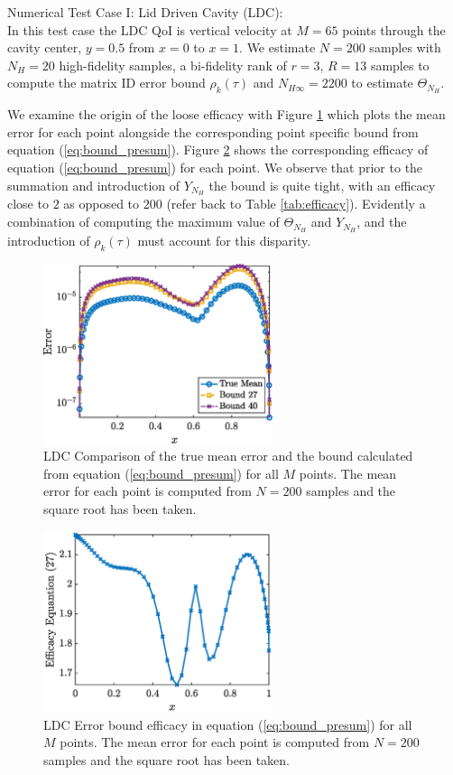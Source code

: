 \documentclass{report}
\begin{document}
Numerical Test Case I: Lid Driven Cavity (LDC): \\

In this test case the LDC QoI is vertical velocity at $M=65$ points through the cavity center, $y=0.5$ from $x=0$ to $x=1$. We estimate $N=200$ samples with $N_H = 20$ high-fidelity samples, a bi-fidelity rank of $r=3$, $R=13$ samples to compute the matrix ID error bound $\rho_k(\tau)$ and $N_{H\infty} = 2200$ to estimate $\Theta_{N_H}$. 

We examine the origin of the loose efficacy with Figure \ref{fig:LDC_eq_27_bound} which plots the mean error for each point alongside the corresponding point specific bound from equation (\ref{eq:bound_presum}). Figure \ref{fig:LDC_eq_27_efficacy} shows the corresponding efficacy of equation (\ref{eq:bound_presum}) for each point. We observe that prior to the summation and introduction of $Y_{N_H}$ the bound is quite tight, with an efficacy close to $2$ as opposed to $200$ (refer back to Table \ref{tab:efficacy}). Evidently a combination of computing the maximum value of $\Theta_{N_H}$ and $Y_{N_H}$, and the introduction of $\rho_k(\tau)$ must account for this disparity. 
% 
\begin{figure}[ht!]
\centering
\includegraphics[width =0.6\textwidth]{Figures/LDC_eq_27_bound.eps}
\caption{LDC Comparison of the true mean error and the bound calculated from equation (\ref{eq:bound_presum}) for all $M$ points. The mean error for each point is computed from $N=200$ samples and the square root has been taken.} 
\label{fig:LDC_eq_27_bound}
\end{figure}
%
% 
\begin{figure}[ht!]
\centering
\includegraphics[width =0.6\textwidth]{Figures/LDC_eq_27_efficacy.eps}
\caption{LDC Error bound efficacy in equation (\ref{eq:bound_presum}) for all $M$ points. The mean error for each point is computed from $N=200$ samples and the square root has been taken.} 
\label{fig:LDC_eq_27_efficacy}
\end{figure}
%
\end{document}
